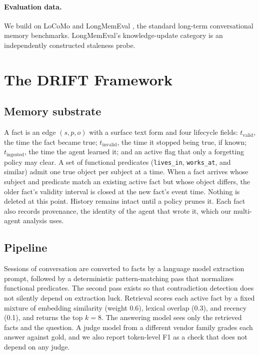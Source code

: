\documentclass[letterpaper]{article} %
\begin{document}
\paragraph{Evaluation data.} We build on LoCoMo \citep{maharana2024locomo} and LongMemEval \citep{wu2025longmemeval}, the standard long-term conversational memory benchmarks. LongMemEval's knowledge-update category is an independently constructed staleness probe.

\section{The DRIFT Framework}

\subsection{Memory substrate}

A fact is an edge $(s, p, o)$ with a surface text form and four lifecycle fields: $t_{\mathrm{valid}}$, the time the fact became true; $t_{\mathrm{invalid}}$, the time it stopped being true, if known; $t_{\mathrm{ingested}}$, the time the agent learned it; and an active flag that only a forgetting policy may clear. A set of functional predicates (\texttt{lives\_in}, \texttt{works\_at}, and similar) admit one true object per subject at a time. When a fact arrives whose subject and predicate match an existing active fact but whose object differs, the older fact's validity interval is closed at the new fact's event time. Nothing is deleted at this point. History remains intact until a policy prunes it. Each fact also records provenance, the identity of the agent that wrote it, which our multi-agent analysis uses.

\subsection{Pipeline}

Sessions of conversation are converted to facts by a language model extraction prompt, followed by a deterministic pattern-matching pass that normalizes functional predicates. The second pass exists so that contradiction detection does not silently depend on extraction luck. Retrieval scores each active fact by a fixed mixture of embedding similarity (weight 0.6), lexical overlap (0.3), and recency (0.1), and returns the top $k=8$. The answering model sees only the retrieved facts and the question. A judge model from a different vendor family grades each answer against gold, and we also report token-level F1 as a check that does not depend on any judge.
\end{document}

